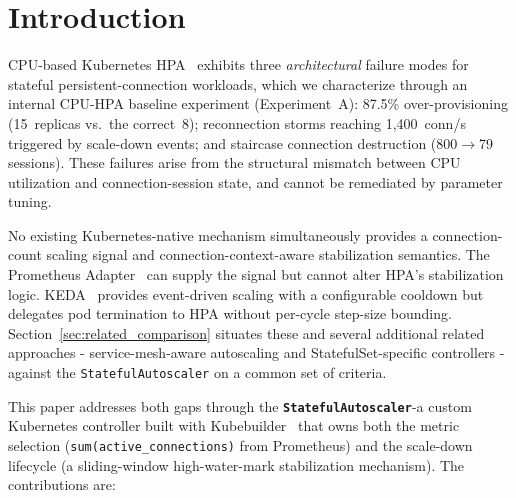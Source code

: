 \documentclass[3p,twocolumn]{elsarticle}
\theoremstyle{plain}%
\theoremstyle{definition}%
\begin{document}
\section{Introduction}
\label{sec:intro}

CPU-based Kubernetes HPA~\cite{k8s_hpa_docs} exhibits three \textit{architectural} failure modes for stateful persistent-connection workloads, which we characterize through an internal CPU-HPA baseline experiment (Experiment~A): 87.5\% over-provisioning (15~replicas vs.\ the correct~8); reconnection storms reaching 1,400~conn/s triggered by scale-down events; and staircase connection destruction (800$\to$79 sessions). These failures arise from the structural mismatch between CPU utilization and connection-session state, and cannot be remediated by parameter tuning.

No existing Kubernetes-native mechanism simultaneously provides a connection-count scaling signal and connection-context-aware stabilization semantics. The Prometheus Adapter~\cite{prometheus_adapter} can supply the signal but cannot alter HPA's stabilization logic. KEDA~\cite{keda_docs} provides event-driven scaling with a configurable cooldown but delegates pod termination to HPA without per-cycle step-size bounding. Section~\ref{sec:related_comparison} situates these and several additional related approaches - service-mesh-aware autoscaling and StatefulSet-specific controllers - against the \texttt{StatefulAutoscaler} on a common set of criteria.

This paper addresses both gaps through the \textbf{\texttt{StatefulAutoscaler}}-a custom Kubernetes controller built with Kubebuilder~\cite{kubebuilder_docs} that owns both the metric selection (\texttt{sum(active\_connections)} from Prometheus) and the scale-down lifecycle (a sliding-window high-water-mark stabilization mechanism). The contributions are:
\end{document}
